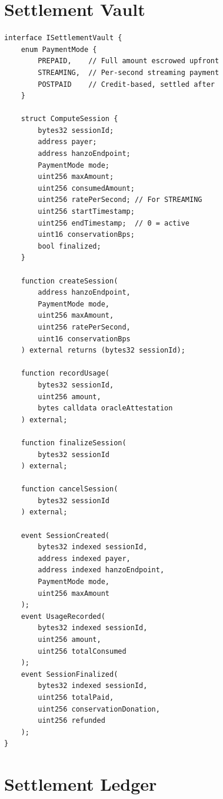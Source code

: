 \documentclass[11pt,letterpaper]{article}
\begin{document}
\section{Settlement Vault}
\label{sec:vault}

\begin{lstlisting}[language=Solidity,caption=ISettlementVault interface]
interface ISettlementVault {
    enum PaymentMode {
        PREPAID,    // Full amount escrowed upfront
        STREAMING,  // Per-second streaming payment
        POSTPAID    // Credit-based, settled after
    }

    struct ComputeSession {
        bytes32 sessionId;
        address payer;
        address hanzoEndpoint;
        PaymentMode mode;
        uint256 maxAmount;
        uint256 consumedAmount;
        uint256 ratePerSecond; // For STREAMING
        uint256 startTimestamp;
        uint256 endTimestamp;  // 0 = active
        uint16 conservationBps;
        bool finalized;
    }

    function createSession(
        address hanzoEndpoint,
        PaymentMode mode,
        uint256 maxAmount,
        uint256 ratePerSecond,
        uint16 conservationBps
    ) external returns (bytes32 sessionId);

    function recordUsage(
        bytes32 sessionId,
        uint256 amount,
        bytes calldata oracleAttestation
    ) external;

    function finalizeSession(
        bytes32 sessionId
    ) external;

    function cancelSession(
        bytes32 sessionId
    ) external;

    event SessionCreated(
        bytes32 indexed sessionId,
        address indexed payer,
        address indexed hanzoEndpoint,
        PaymentMode mode,
        uint256 maxAmount
    );
    event UsageRecorded(
        bytes32 indexed sessionId,
        uint256 amount,
        uint256 totalConsumed
    );
    event SessionFinalized(
        bytes32 indexed sessionId,
        uint256 totalPaid,
        uint256 conservationDonation,
        uint256 refunded
    );
}
\end{lstlisting}

\section{Settlement Ledger}
\label{sec:ledger}
\end{document}
